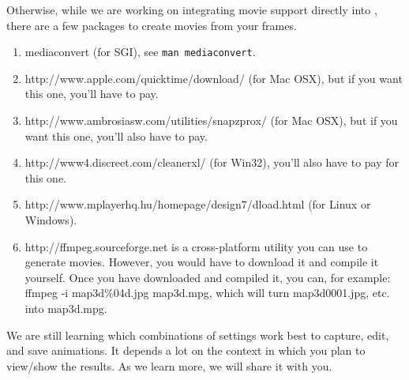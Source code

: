 Otherwise, while we are working on integrating movie support directly into
\map{}, there are a few packages to create movies from your frames.
%
\begin{enumerate}
  \item mediaconvert (for SGI), see \texttt{man mediaconvert}.
  \item {}
    {http://www.apple.com/quicktime/download/} (for Mac OSX), but if you
    want this one, you'll have to pay.
  \item {}
    {http://www.ambrosiasw.com/utilities/snapzprox/} (for Mac OSX), but if you
    want this one, you'll also have to pay.
  \item {}
    {http://www4.discreet.com/cleanerxl/} 
    (for Win32), you'll also have to pay for this one.
  \item {}
    {http://www.mplayerhq.hu/homepage/design7/dload.html} (for Linux or
    Windows).   
  \item {} {http://ffmpeg.sourceforge.net} is a 
    cross-platform utility you can use to generate movies.
    However, you would have to download it and compile it yourself.
    Once you have downloaded and compiled it, you can, for example: 
    ffmpeg -i map3d\%04d.jpg map3d.mpg, which will turn map3d0001.jpg, etc.
    into map3d.mpg.
\end{enumerate}

We are still learning which combinations of settings work best to capture,
edit, and save animations.  It depends a lot on the context in which you
plan to view/show the results.  As we learn more, we will share it with you.


